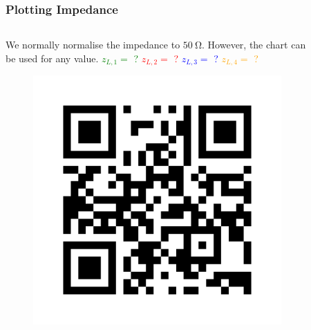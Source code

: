 \documentclass[10pt, compress]{beamer}
\begin{document}
\begin{frame}
    \frametitle{Plotting Impedance}
    \begin{columns}[T] %
        \begin{column}{.4\textwidth}
            \begin{outline}
                \1 We normally normalise the impedance to $\SI{50}{\ohm}$.
                \1 However, the chart can be used for any value.
                \1 \textcolor{green}{$z_{L,1} = $ ?}
                \1 \textcolor{red}{$z_{L,2} =  $ ? }
                \1 \textcolor{blue}{$z_{L,3} = $ ? }
                \1 \textcolor{orange}{$z_{L,4} = $ ?}
            \end{outline}
            \begin{figure}
                \includegraphics[width=.75\textwidth]{QR-code.png}
            \end{figure}
        \end{column}
        \begin{column}[T]{.6\textwidth}
            \begin{figure}
                \centering

\end{figure}
\end{column}
\end{columns}
\end{frame}
\end{document}

